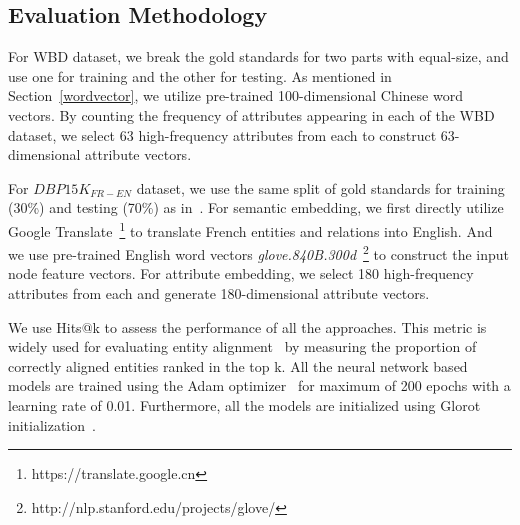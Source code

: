 	\subsection{Evaluation Methodology}
	
	For WBD dataset, we break the gold standards for two parts with equal-size, and use one for training and the other for testing. 
	As mentioned in Section~\ref{wordvector}, we utilize pre-trained 100-dimensional Chinese word vectors. 
	By counting the frequency of attributes appearing in each \KG of the WBD dataset, we select 63 high-frequency attributes from each \KG to construct 63-dimensional attribute vectors.
	
	For $DBP15K_{FR-EN}$ dataset, we use the same split of gold standards for training (30\%) and testing (70\%) as in~\cite{sun2017cross}. 
	For semantic embedding, we first directly utilize Google Translate~\footnote{https://translate.google.cn} to translate French entities and relations into English. 
	And we use pre-trained English word vectors \emph{glove.840B.300d}~\footnote{http://nlp.stanford.edu/projects/glove/} to construct the input node feature vectors. 
	For attribute embedding, we select 180 high-frequency attributes from each \KG and generate 180-dimensional attribute vectors.
	
	We use Hits@k to assess the performance of all the approaches. 
	This metric is widely used for evaluating entity alignment~\cite{hao2016joint,chen2016multilingual,sun2017cross,zhu2017iterative} by measuring the proportion of correctly aligned entities ranked in the top k. 
	All the neural network based models are trained using the Adam optimizer~\cite{Kingma2014Adam} for maximum of 200 epochs with a learning rate
    of 0.01. 
    Furthermore, all the models are initialized using Glorot initialization~\cite{Glorot2010Understanding}.
	

